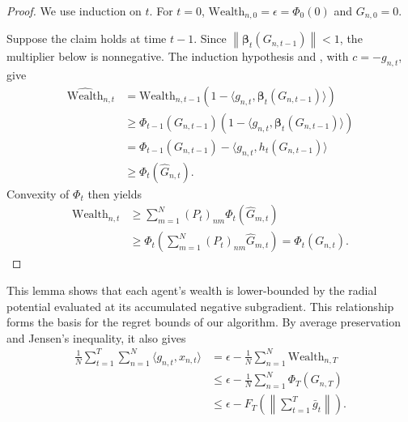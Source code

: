 \documentclass[journal]{IEEEtran}
\newcommand{\w}{\text{Wealth}}
\newcommand{\br}[1]{\left(#1\right)}
\newcommand{\norm}[1]{\left\lVert{#1}\right\rVert}
\begin{document}
{\begin{proof}
    We use induction on $t$.
    For $t=0$, $\w_{n,0}=\epsilon=\Phi_0(0)$ and $G_{n,0}=0$.

    Suppose the claim holds at time $t-1$.
    Since $\norm{\boldsymbol{\beta}_t(G_{n,t-1})}<1$, the multiplier below is nonnegative.
    The induction hypothesis and , with $c=-g_{n,t}$, give
    \begin{align}
        \widehat{\w}_{n,t}
         & =\w_{n,t-1}\br{1-\langle g_{n,t},\boldsymbol{\beta}_t(G_{n,t-1})\rangle} \\
         & \geq\Phi_{t-1}(G_{n,t-1})
        \br{1-\langle g_{n,t},\boldsymbol{\beta}_t(G_{n,t-1})\rangle}               \\
         & =\Phi_{t-1}(G_{n,t-1})-\langle g_{n,t},h_t(G_{n,t-1})\rangle             \\
         & \geq\Phi_t(\widehat G_{n,t}).
    \end{align}
    Convexity of $\Phi_t$ then yields
    \begin{align}
        \w_{n,t}
         & \geq\sum_{m=1}^N{(P_t)}_{nm}\Phi_t(\widehat G_{m,t})            \\
         & \geq\Phi_t\left(\sum_{m=1}^N{(P_t)}_{nm}\widehat G_{m,t}\right)
        =\Phi_t(G_{n,t}).
    \end{align}
\end{proof}
}
{\color{blue}
    This lemma shows that each agent's wealth is lower-bounded by the radial potential evaluated at its accumulated negative subgradient.
    This relationship forms the basis for the regret bounds of our algorithm.
    By average preservation and Jensen's inequality, it also gives
    \begin{align}
        \frac{1}{N}\sum_{t=1}^T\sum_{n=1}^N\langle g_{n,t},x_{n,t}\rangle
         & =\epsilon-\frac{1}{N}\sum_{n=1}^N\w_{n,T}                 \\
         & \leq\epsilon-\frac{1}{N}\sum_{n=1}^N\Phi_T(G_{n,T})       \\
         & \leq\epsilon-F_T\left(\norm{\sum_{t=1}^T\bar g_t}\right).
        \label{eq:wealth_lb_average}
    \end{align}
}
\end{document}
